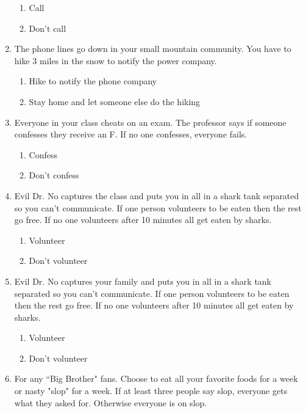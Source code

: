 \begin{enumerate}
\begin{enumerate}
\item Call
\item Don't call
\end{enumerate}

\item The phone lines go down in your small mountain community. You have to hike 3 miles in the snow to notify the power company.

\begin{enumerate}
\item Hike to notify the phone company
\item Stay home and let someone else do the hiking
\end{enumerate}

\item Everyone in your class cheats on an exam. The professor says if someone confesses they receive an F. If no one confesses, everyone fails.

\begin{enumerate}
\item Confess
\item Don't confess
\end{enumerate}

\item Evil Dr. No captures the class and puts you in all in a shark tank separated so you can't communicate. If one person volunteers to be eaten then the rest go free. If no one volunteers after 10 minutes all get eaten by sharks.

\begin{enumerate}
\item Volunteer
\item Don't volunteer
\end{enumerate}

\item Evil Dr. No captures your family and puts you in all in a shark tank separated so you can't communicate. If one person volunteers to be eaten then the rest go free. If no one volunteers after 10 minutes all get eaten by sharks.

\begin{enumerate}
\item Volunteer
\item Don't volunteer
\end{enumerate}

\item For any ``Big Brother" fans. Choose to eat all your favorite foods for a week or nasty "slop" for a week. If at least three people say slop, everyone gets what they asked for. Otherwise everyone is on slop.


\end{enumerate}
